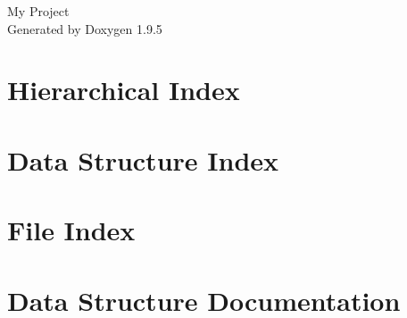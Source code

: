 \documentclass[twoside]{book}
\newcommand{\+}{\discretionary{\mbox{\scriptsize$\hookleftarrow$}}{}{}}
\newcommand{\clearemptydoublepage}{%
    \newpage{\pagestyle{empty}\cleardoublepage}%
  }
\begin{document}
  \raggedbottom
    \hypersetup{pageanchor=false,
                bookmarksnumbered=true,
                pdfencoding=unicode
               }
  \begin{titlepage}
  \vspace*{7cm}
  \begin{center}%
  {\Large My Project}\\
  \vspace*{1cm}
  {\large Generated by Doxygen 1.9.5}\\
  \end{center}
  \end{titlepage}
  \clearemptydoublepage
  \tableofcontents
  \clearemptydoublepage
  \hypersetup{pageanchor=true}
\chapter{Hierarchical Index}

\chapter{Data Structure Index}

\chapter{File Index}

\chapter{Data Structure Documentation}













\end{document}
